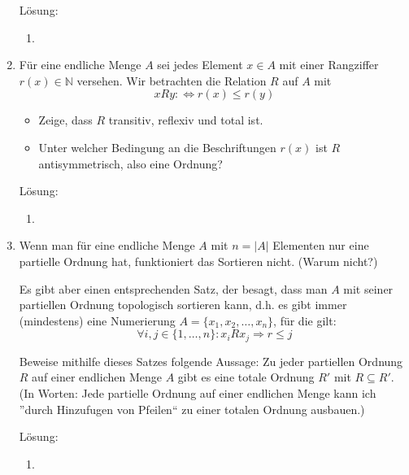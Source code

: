 \documentclass[../main.tex]{subfiles}
\begin{document}
\begin{enumerate}
	      Lösung:
	      \begin{enumerate}
		      \item
	      \end{enumerate}
	\item  Für eine endliche Menge \( A \) sei jedes Element \( x \in A \) mit einer Rangziffer
	      \( r(x) \in \mathbb{N} \) versehen. Wir betrachten die Relation \( R \) auf \( A \) mit
	      \[ xRy: \Leftrightarrow r(x) \leq r(y) \]
	      \begin{itemize}
		      \item Zeige, dass \( R \) transitiv, reflexiv und total ist.
		      \item Unter welcher Bedingung an die Beschriftungen \( r(x) \) ist \( R \) antisymmetrisch,
		            also eine Ordnung?
	      \end{itemize}

	      Lösung:
	      \begin{enumerate}
		      \item
	      \end{enumerate}
	\item Wenn man für eine endliche Menge \( A \) mit \( n = |A| \) Elementen nur eine
	      partielle Ordnung hat, funktioniert das Sortieren nicht. (Warum nicht?)

	      Es gibt aber einen entsprechenden Satz, der besagt, dass man \( A \) mit seiner
	      partiellen Ordnung topologisch sortieren kann, d.h. es gibt immer (mindestens)
	      eine Numerierung \( A = \{ x_1, x_2, \dots, x_n \} \), für die gilt:
	      \[ \forall i, j \in \{ 1, \dots, n\} : x_iRx_j \Rightarrow r \leq j \]

	      Beweise mithilfe dieses Satzes folgende Aussage: Zu jeder partiellen Ordnung
	      \( R \) auf einer endlichen Menge \( A \) gibt es eine totale Ordnung \( R' \)
	      mit \( R \subseteq R' \). (In Worten:
	      Jede partielle Ordnung auf einer endlichen Menge kann ich ”durch
	      Hinzufugen von Pfeilen“ zu einer totalen Ordnung ausbauen.)

	      Lösung:
	      \begin{enumerate}
		      \item
	      \end{enumerate}
\end{enumerate}
\end{document}
